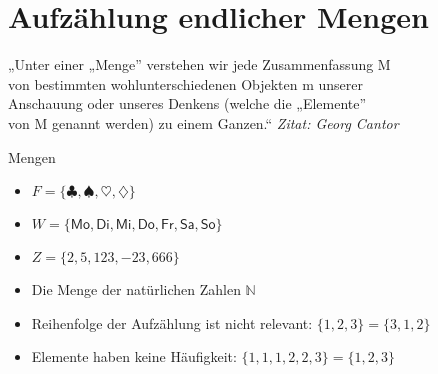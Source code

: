 \documentclass{article}
\begin{document}
\large
\section*{Aufzählung endlicher Mengen}
\begin{center}
    „Unter einer „Menge” verstehen wir jede Zusammenfassung M \\
    von bestimmten wohlunterschiedenen Objekten m unserer \\
    Anschauung oder unseres Denkens (welche die „Elemente” \\
    von M genannt werden) zu einem Ganzen.“
    \textit{Zitat: Georg Cantor}
\end{center}

\begin{exampleBox}{Mengen}
	\begin{itemize}[label=]
		\item $F = \{\clubsuit, \spadesuit, \heartsuit, \diamondsuit\}$
		\item $W = \{\mathsf{Mo}, \mathsf{Di}, \mathsf{Mi}, \mathsf{Do}, \mathsf{Fr}, \mathsf{Sa}, \mathsf{So}\}$
		\item $Z = \{2, 5, 123, -23, 666\}$
		\item Die Menge der natürlichen Zahlen $\mathbb{N}$ 
	\end{itemize}
\end{exampleBox}
\begin{noteBox}
    \begin{itemize}[label=]
        \item Reihenfolge der Aufzählung ist nicht relevant: $\{1,2,3\} = \{3,1,2\}$
        \item Elemente haben keine Häufigkeit: $\{1,1,1,2,2,3\} = \{1,2,3\}$
    \end{itemize}
\end{noteBox}
\end{document}
